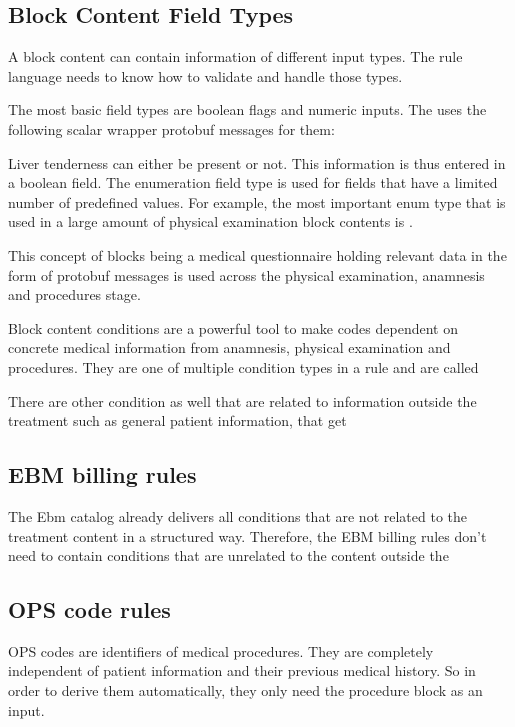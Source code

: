 \subsection{Block Content Field Types}
A block content can contain information of different input types.
The rule language needs to know how to validate and handle those types.

The most basic field types are boolean flags and numeric inputs.
The \AV uses the following scalar wrapper protobuf messages for them:




Liver tenderness can either be present or not.
This information is thus entered in a boolean field.
The enumeration field type is used for fields that have a limited number of predefined values.
For example, the most important enum type that is used in a large amount of physical examination block contents is .





This concept of blocks being a medical questionnaire holding relevant data in the form of protobuf messages is used across the physical examination, anamnesis and procedures stage.



Block content conditions are a powerful tool to make codes dependent on concrete medical information from anamnesis, physical examination and procedures.
They are one of multiple condition types in a rule and are called 


There are other condition as well that are related to information outside the treatment such as general patient information, that get


\subsection{EBM billing rules}
The Ebm catalog already delivers all conditions that are not related to the treatment content in a structured way.
Therefore, the EBM billing rules don't need to contain conditions that are unrelated to the content outside the

\subsection{OPS code rules}
OPS codes are identifiers of medical procedures.
They are completely independent of patient information and their previous medical history.
So in order to derive them automatically, they only need the procedure block as an input.

